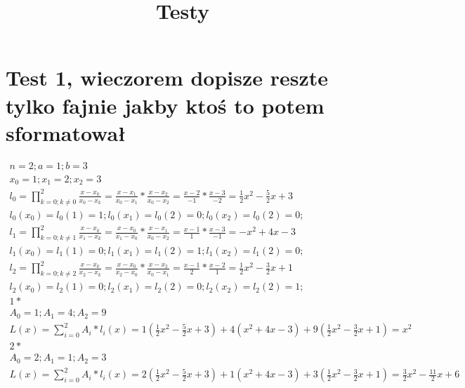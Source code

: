 \documentclass[12pt,a4paper]{article}
\title{Testy}
\theoremstyle{definition}
\begin{document}


\section{Test 1, wieczorem dopisze reszte tylko fajnie jakby ktoś to potem sformatował}

	\begin{displaymath} 
\begin{split}
		n=2; a=1; b=3  \\
		x_0=1; x_1=2; x_2=3\\
l_0=\prod\limits_{k=0;k\neq0}^2\frac{x-x_k}{x_0-x_k}=\frac{x-x_1}{x_0-x_1}*\frac{x-x_2}{x_0-x_2}=\frac{x-2}{-1}*\frac{x-3}{-2}=\frac{1}{2}x^2-\frac{5}{2}x+3\\
l_0(x_0)=l_0(1)=1; l_0(x_1)=l_0(2)=0; l_0(x_2)=l_0(2)=0;\\
l_1=\prod\limits_{k=0;k\neq1}^2\frac{x-x_k}{x_1-x_k}=\frac{x-x_0}{x_1-x_0}*\frac{x-x_1}{x_0-x_2}=\frac{x-1}{1}*\frac{x-3}{-1}=-x^2+4x-3\\
l_1(x_0)=l_1(1)=0; l_1(x_1)=l_1(2)=1; l_1(x_2)=l_1(2)=0;\\
l_2=\prod\limits_{k=0;k\neq2}^2\frac{x-x_k}{x_2-x_k}=\frac{x-x_0}{x_2-x_0}*\frac{x-x_2}{x_0-x_1}=\frac{x-1}{2}*\frac{x-2}{1}=\frac{1}{2}x^2-\frac{3}{2}x+1\\
l_2(x_0)=l_2(1)=0; l_2(x_1)=l_2(2)=0; l_2(x_2)=l_2(2)=1;\\
1*\\
A_0=1; A_1=4; A_2=9\\
L(x)=\sum\limits_{i=0}^2A_i*l_i(x)=1(\frac{1}{2}x^2-\frac{5}{2}x+3)+4(x^2+4x-3)+9(\frac{1}{2}x^2-\frac{3}{2}x+1)=x^2\\
2*\\
A_0=2; A_1=1; A_2=3\\
L(x)=\sum\limits_{i=0}^2A_i*l_i(x)=2(\frac{1}{2}x^2-\frac{5}{2}x+3)+1(x^2+4x-3)+3(\frac{1}{2}x^2-\frac{3}{2}x+1)=\frac{3}{2}x^2-\frac{11}{2}x+6\\
\end{split}
\end{displaymath}
\end{document}
